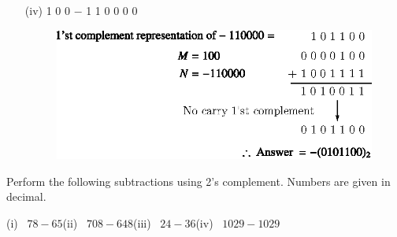 \begin{solution}
\begin{itemize}
\item[(iv)] 1 0 0 $-$ 1 1 0 0 0 0
\begin{figure}[H]
\centering
\includegraphics{chap5/div37.eps}
\end{figure}
\end{itemize}
\end{solution}

\begin{problem}\label{prob5.30}
Perform the following subtractions using 2's complement. Numbers are given in decimal.

\smallskip
(i)~ $78-65$\hfil (ii)~ $708-648$\hfil (iii)~ $24-36$\hfil (iv)~ $1029-1029$
\end{problem}

\eject


